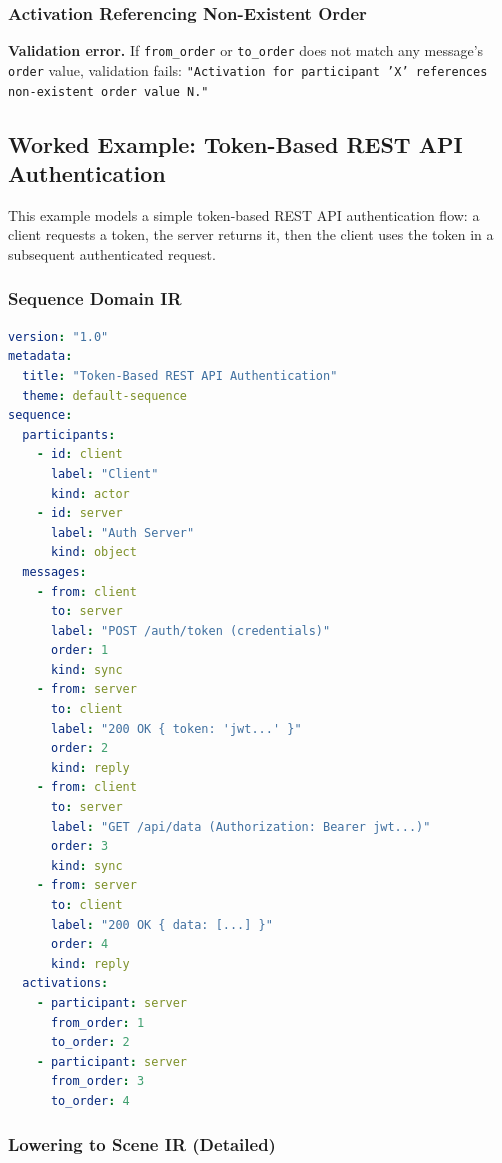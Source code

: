 \subsubsection{Activation Referencing Non-Existent Order}

\textbf{Validation error.} If \texttt{from\_order} or \texttt{to\_order} does not match any message's \texttt{order} value, validation fails: \texttt{"Activation for participant 'X' references non-existent order value N."}

\subsection{Worked Example: Token-Based REST API Authentication}
\label{sec:seq-worked-example}

This example models a simple token-based REST API authentication flow: a client requests a token, the server returns it, then the client uses the token in a subsequent authenticated request.

\subsubsection{Sequence Domain IR}

\begin{lstlisting}[language=yaml,caption={REST API auth --- Sequence Domain IR}]
version: "1.0"
metadata:
  title: "Token-Based REST API Authentication"
  theme: default-sequence
sequence:
  participants:
    - id: client
      label: "Client"
      kind: actor
    - id: server
      label: "Auth Server"
      kind: object
  messages:
    - from: client
      to: server
      label: "POST /auth/token (credentials)"
      order: 1
      kind: sync
    - from: server
      to: client
      label: "200 OK { token: 'jwt...' }"
      order: 2
      kind: reply
    - from: client
      to: server
      label: "GET /api/data (Authorization: Bearer jwt...)"
      order: 3
      kind: sync
    - from: server
      to: client
      label: "200 OK { data: [...] }"
      order: 4
      kind: reply
  activations:
    - participant: server
      from_order: 1
      to_order: 2
    - participant: server
      from_order: 3
      to_order: 4
\end{lstlisting}

\subsubsection{Lowering to Scene IR (Detailed)}

